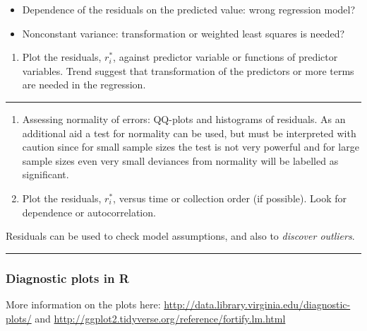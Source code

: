\documentclass[
]{article}
\providecommand{\tightlist}{%
  \setlength{\itemsep}{0pt}\setlength{\parskip}{0pt}}
\begin{document}
\begin{itemize}
\item
  Dependence of the residuals on the predicted value: wrong regression
  model?
\item
  Nonconstant variance: transformation or weighted least squares is
  needed?
\end{itemize}

\begin{enumerate}
\def\labelenumi{\arabic{enumi}.}
\setcounter{enumi}{1}
\tightlist
\item
  Plot the residuals, \(r^*_i\), against predictor variable or functions
  of predictor variables. Trend suggest that transformation of the
  predictors or more terms are needed in the regression.
\end{enumerate}

\begin{center}\rule{0.5\linewidth}{0.5pt}\end{center}

\begin{enumerate}
\def\labelenumi{\arabic{enumi}.}
\setcounter{enumi}{2}
\item
  Assessing normality of errors: QQ-plots and histograms of residuals.
  As an additional aid a test for normality can be used, but must be
  interpreted with caution since for small sample sizes the test is not
  very powerful and for large sample sizes even very small deviances
  from normality will be labelled as significant.
\item
  Plot the residuals, \(r^*_i\), versus time or collection order (if
  possible). Look for dependence or autocorrelation.
\end{enumerate}

Residuals can be used to check model assumptions, and also to
\emph{discover outliers}.

\begin{center}\rule{0.5\linewidth}{0.5pt}\end{center}

\hypertarget{diagnostic-plots-in-r}{%
\subsubsection{Diagnostic plots in R}\label{diagnostic-plots-in-r}}

More information on the plots here:
\url{http://data.library.virginia.edu/diagnostic-plots/} and
\url{http://ggplot2.tidyverse.org/reference/fortify.lm.html}
\end{document}
